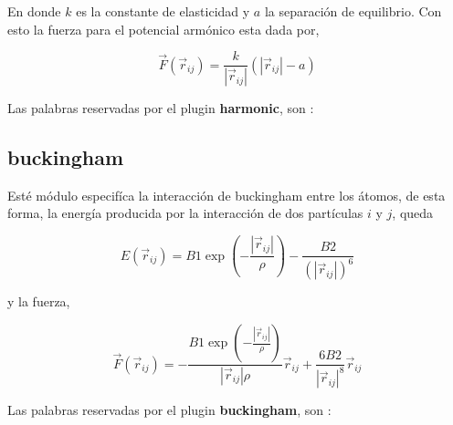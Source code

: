En donde $k$ es la constante de elasticidad y $a$ la separaci\'on de equilibrio. Con esto la fuerza para el potencial arm\'onico esta dada por,

$$\vec{F}(\vec{r}_{ij}) = \frac{k}{|\vec{r}_{ij}|}\left(|\vec{r}_{ij}|-a\right)$$

Las palabras reservadas por el plugin \textbf{harmonic}, son :


\subsection{buckingham}

Est\'e m\'odulo especif\'ica la interacci\'on de buckingham entre los \'atomos, de esta forma, la energ\'ia producida por la interacci\'on de dos part\'iculas $i$ y $j$, queda

$$E(\vec{r}_{ij}) = B1 \exp\left(-\frac{|\vec{r}_{ij}|}{\rho}\right) - \frac{B2}{(|\vec{r}_{ij}|)^6}$$

y la fuerza,

$$\vec{F}(\vec{r}_{ij}) = -\frac{B1\exp\left(-\frac{|\vec{r}_{ij}|}{\rho}\right)}{|\vec{r}_{ij}|\rho}\vec{r}_{ij} + \frac{6B2}{|\vec{r}_{ij}|^8}\vec{r}_{ij}$$

Las palabras reservadas por el plugin \textbf{buckingham}, son :


